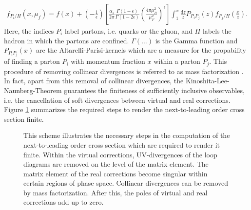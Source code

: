 \begin{align}
f_{P_i / H}(x,\mu_f) = f(x) + \left( -\frac{1}{\epsilon} \right)\left[ \frac{\alpha_s}{2\pi} \frac{\Gamma(1-\epsilon)}{\Gamma(1-2\epsilon)} \left( \frac{4\pi\mu_R^2}{\mu_F^2} \right)^\epsilon\right] \int_1^x\frac{\mathrm{d}z}{z} P_{P_i P_j}(z)f_{P_j / H}(\frac{x}{z}).\label{eq:renpdf}
\end{align}
Here, the indices $P_i$ label partons, i.e. quarks or the gluon, and $H$ labels the hadron in which the partons are confined. $\Gamma(\hdots)$ is the Gamma function and $P_{P_i P_j}(x)$ are the Altarelli-Parisi-kernels\cite{Altarelli:1977zs} which are a measure for the propability of finding a parton $P_i$ with momentum fraction $x$ within a parton $P_j$. This procedure of removing collinear divergences is referred to as mass factorization \cite{dissertori2003quantum}.\\
In fact, apart from this removal of collinear divergences, the Kinoshita-Lee-Naunberg-Theorem \cite{1962JMP.....3..650K, PhysRev.133.B1549} guarantees the finiteness of sufficiently inclusive observables, i.e. the cancellation of soft divergences between virtual and real corrections.\\
Figure \ref{fig:DivergenceSummary} summarizes the required steps to render the next-to-leading order cross section finite.
\begin{figure}[H]
\begin{center}
\caption{This scheme illustrates the necessary steps in the computation of the next-to-leading order cross section which are required to render it finite. Within the virtual corrections, UV-divergences of the loop diagrams are removed on the level of the matrix element. The matrix element of the real corrections become singular within certain regions of phase space. Collinear divergences can be removed by mass factorization. After this, the poles of virtual and real corrections add up to zero.}\label{fig:DivergenceSummary}
\end{center}
\end{figure}


